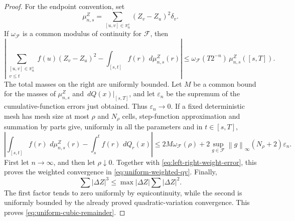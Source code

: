 \documentclass[11pt,reqno]{amsart}
\theoremstyle{plain}
\theoremstyle{definition}
\newcommand{\dd}{\,d}
\newcommand{\norm}[1]{\left\lVert #1\right\rVert}
\newcommand{\abs}[1]{\left\lvert #1\right\rvert}
\begin{document}
\begin{proof}
For the endpoint convention, set
\[
  \mu_{n,s}^Z
  =\sum_{[u,v]\in\pi_n^s}(Z_v-Z_u)^2\delta_v.
\]
If \(\omega_{\mathscr F}\) is a common modulus of continuity for
\(\mathscr F\), then
\begin{equation}\label{eq:left-right-weight-error}
  \left|
    \sum_{\substack{[u,v]\in\pi_n^s\\v\le t}}
      f(u)(Z_v-Z_u)^2
    -\int_{[s,t]}f(r)\,\dd\mu_{n,s}^Z(r)
  \right|
  \le
  \omega_{\mathscr F}(T2^{-n})\,
  \mu_{n,s}^Z([s,T]).
\end{equation}
The total masses on the right are uniformly bounded.  Let \(M\) be a common
bound for the masses of \(\mu_{n,s}^Z\) and \(\dd Q(x)|_{[s,T]}\), and let
\(\varepsilon_n\) be the supremum of the cumulative-function errors just
obtained.  Thus \(\varepsilon_n\to0\).  If a fixed deterministic mesh has
mesh size at most \(\rho\) and \(N_\rho\) cells, step-function approximation
and summation by parts give, uniformly in all the parameters and in
\(t\in[s,T]\),
\[
  \left|
    \int_{[s,t]}f(r)\,\dd\mu_{n,s}^Z(r)
    -\int_s^t f(r)\,\dd Q_r(x)
  \right|
  \le
  2M\omega_{\mathscr F}(\rho)
  +2\sup_{g\in\mathscr F}\norm{g}_\infty
      (N_\rho+2)\varepsilon_n.
\]
First let \(n\to\infty\), and then let \(\rho\downarrow0\).  Together with
\eqref{eq:left-right-weight-error}, this proves the weighted convergence in
\eqref{eq:uniform-weighted-qv}.  Finally,
\[
  \sum\abs{\Delta Z}^3
  \le
  \max\abs{\Delta Z}\sum\abs{\Delta Z}^2.
\]
The first factor tends to zero uniformly by equicontinuity, while the second
is uniformly bounded by the already proved quadratic-variation convergence.
This proves \eqref{eq:uniform-cubic-remainder}.
\end{proof}
\end{document}
